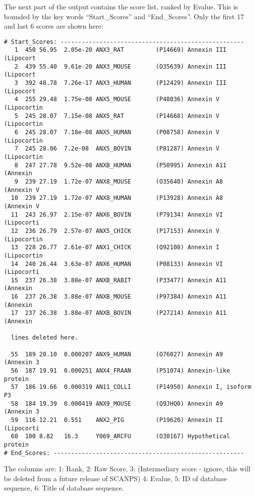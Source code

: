 \documentclass[12pt]{article}
\begin{document}
The next part of the output contains the score list, ranked by Evalue.
This is bounded by the key words ``Start\_Scores'' and
``End\_Scores''.  Only the first 17 and last 6 scores are shown here:

\begin{scriptsize}
\begin{verbatim}
# Start_Scores: ----------------------------------------------------
   1  450 56.95  2.05e-20 ANX3_RAT         (P14669) Annexin III (Lipocort
   2  439 55.40  9.61e-20 ANX3_MOUSE       (O35639) Annexin III (Lipocort
   3  392 48.78  7.26e-17 ANX3_HUMAN       (P12429) Annexin III (Lipocort
   4  255 29.48  1.75e-08 ANX5_MOUSE       (P48036) Annexin V (Lipocortin
   5  245 28.07  7.15e-08 ANX5_RAT         (P14668) Annexin V (Lipocortin
   6  245 28.07  7.18e-08 ANX5_HUMAN       (P08758) Annexin V (Lipocortin
   7  245 28.06  7.2e-08  ANX5_BOVIN       (P81287) Annexin V (Lipocortin
   8  247 27.78  9.52e-08 ANXB_HUMAN       (P50995) Annexin A11 (Annexin 
   9  239 27.19  1.72e-07 ANX8_MOUSE       (O35640) Annexin A8 (Annexin V
  10  239 27.19  1.72e-07 ANX8_HUMAN       (P13928) Annexin A8 (Annexin V
  11  243 26.97  2.15e-07 ANX6_BOVIN       (P79134) Annexin VI (Lipocorti
  12  236 26.79  2.57e-07 ANX5_CHICK       (P17153) Annexin V (Lipocortin
  13  228 26.77  2.61e-07 ANX1_CHICK       (Q92108) Annexin I (Lipocortin
  14  240 26.44  3.63e-07 ANX6_HUMAN       (P08133) Annexin VI (Lipocorti
  15  237 26.38  3.88e-07 ANXB_RABIT       (P33477) Annexin A11 (Annexin 
  16  237 26.38  3.88e-07 ANXB_MOUSE       (P97384) Annexin A11 (Annexin 
  17  237 26.38  3.88e-07 ANXB_BOVIN       (P27214) Annexin A11 (Annexin 

  lines deleted here.

  55  189 20.10  0.000207 ANX9_HUMAN       (O76027) Annexin A9 (Annexin 3
  56  187 19.91  0.000251 ANX4_FRAAN       (P51074) Annexin-like protein 
  57  186 19.66  0.000319 AN11_COLLI       (P14950) Annexin I, isoform P3
  58  184 19.39  0.000419 ANX9_MOUSE       (Q9JHQ0) Annexin A9 (Annexin 3
  59  116 12.21  0.551    ANX2_PIG         (P19620) Annexin II (Lipocorti
  60  100 8.82   16.3     Y069_ARCFU       (O30167) Hypothetical protein 
# End_Scores: ------------------------------------------------------
\end{verbatim}
\end{scriptsize}

The columns are: 1: Rank, 2: Raw Score, 3: (Intermediary score -
ignore, this will be deleted from a future release of SCANPS) 4:
Evalue, 5: ID of database sequence, 6: Title of database sequence.
\end{document}
